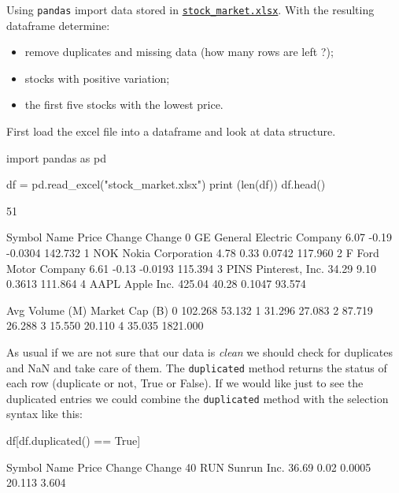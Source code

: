 \begin{question}
Using \texttt{pandas} import data stored in \href{https://drive.google.com/file/d/1Uu9lQorvzM-1xwRKPNszaSqlCYAiY-gr/view?usp=sharing}{\texttt{stock\_market.xlsx}}. With the resulting dataframe determine:
\begin{itemize}
\item remove duplicates and missing data (how many rows are left ?);
\item stocks with positive variation;
\item the first five stocks with the lowest price.
\end{itemize}
\end{question}

\cprotEnv\begin{solution}
First load the excel file into a dataframe and look at data structure.

\begin{ipython}
import pandas as pd

df = pd.read_excel("stock_market.xlsx")
print (len(df))
df.head()

51

  Symbol                      Name   Price  Change  Change%
0     GE  General Electric Company    6.07   -0.19  -0.0304     142.732
1    NOK         Nokia Corporation    4.78    0.33   0.0742     117.960
2      F        Ford Motor Company    6.61   -0.13  -0.0193     115.394
3   PINS           Pinterest, Inc.   34.29    9.10   0.3613     111.864
4   AAPL                Apple Inc.  425.04   40.28   0.1047      93.574

   Avg Volume (M)  Market Cap (B)
0         102.268          53.132
1          31.296          27.083
2          87.719          26.288
3          15.550          20.110
4          35.035        1821.000
\end{ipython}
        
As usual if we are not sure that our data is \emph{clean} we should check for duplicates and NaN and take care of them. The \texttt{duplicated} method returns the status of each row (duplicate or not, True or False). If we would like just to see the duplicated entries we could combine the \texttt{duplicated} method with the selection syntax like this:

\begin{ipython}
df[df.duplicated() == True]

   Symbol         Name  Price  Change  Change%
40    RUN  Sunrun Inc.  36.69    0.02   0.0005      20.113           3.604


\end{ipython}
\end{solution}
